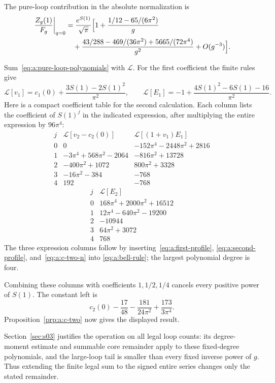 \begin{prp}\label{prp:a:pure-loops}
The pure-loop contribution in the absolute normalization is
\begin{equation}\label{eq:a:q-zero}
\begin{aligned}
 \left.\frac{Z_g(1)}{F_g}\right|_{q=0}
 &=\frac{e^{S(1)}}{\sqrt\pi}\Bigl[1
   +\frac{1/12-65/(6\pi^2)}g\\
 &\quad+\frac{43/288-469/(36\pi^2)+5665/(72\pi^4)}{g^2}
   +O(g^{-3})\Bigr].
\end{aligned}
\end{equation}
\end{prp}
\begin{prf}
Sum~\eqref{eq:a:pure-loop-polynomials} with $\mathcal L$.
For the first coefficient the finite rules give
\[
 \mathcal L[v_1]=c_1(0)+\frac{3S(1)-2S(1)^2}{\pi^2},\qquad
 \mathcal L[E_1]=-1+\frac{4S(1)^2-6S(1)-16}{\pi^2}.
\]
Here is a compact coefficient table for the second calculation. Each
column lists the coefficient of $S(1)^j$ in the indicated expression,
after multiplying the entire expression by $96\pi^4$:
\[
\begin{array}{c|r|r}
 j&\mathcal L[v_2-c_2(0)]&\mathcal L[(1+v_1)E_1]\\\hline
0&0&-152\pi^4-2448\pi^2+2816\\
1&-3\pi^4+568\pi^2-2064&-816\pi^2+13728\\
2&-400\pi^2+1072&800\pi^2+3328\\
3&-16\pi^2-384&-768\\
4&192&-768
\end{array}
\]
\[
\begin{array}{c|r}
 j&\mathcal L[E_2]\\\hline
0&168\pi^4+2000\pi^2+16512\\
1&12\pi^4-640\pi^2-19200\\
2&-10944\\
3&64\pi^2+3072\\
4&768
\end{array}
\]
The three expression columns follow by inserting~\eqref{eq:a:first-profile},
\eqref{eq:a:second-profile}, and~\eqref{eq:a:c-two-n} into
\eqref{eq:a:bell-rule}; the largest polynomial degree is four.

Combining these columns with coefficients $1,1/2,1/4$ cancels every
positive power of $S(1)$. The constant left is
\[
 c_2(0)-\frac{17}{48}-\frac{181}{24\pi^2}
                                      +\frac{173}{3\pi^4}.
\]
Proposition~\ref{prp:a:c-two} now gives the displayed result.

Section~\ref{sec:s03} justifies the operation on all legal loop
counts: its degree-moment estimate and summable core remainder apply
to these fixed-degree polynomials, and the large-loop tail is smaller
than every fixed inverse power of $g$. Thus extending the finite legal
sum to the signed entire series changes only the stated remainder.
\end{prf}

